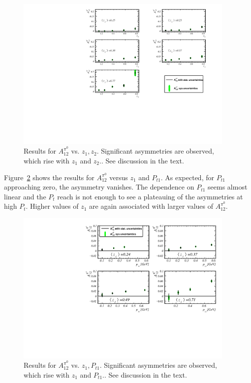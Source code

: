 \documentclass[aps,prX,preprint,groupedaddress,linenumbers]{revtex4-1}
\begin{document}
\begin{figure}
\includegraphics[width=0.95\textwidth]{figs_paper/pi0VsZ1Z2.pdf}
\caption{Results for $A^{\pi^0}_{12}$ vs. $z_1,z_2$. Significant asymmetries are observed, which rise with $z_1$ and $z_2$.\label{fig:resPi0VsZ1Z2}. See discussion in the text.}
\end{figure}

Figure~\ref{fig:resPi0VsZPt} shows the results for $A^{\pi^0}_{12}$ versus $z_1$ and $P_{t1}$. As expected, for $P_{t1}$ approaching zero, the asymmetry vanishes. The dependence on $P_{t1}$ seems almost linear and the $P_t$ reach is not enough to see a plateauing of the asymmetries at high $P_t$. Higher values of $z_1$ are again associated with larger values of $A^{\pi^0}_{12}$.
\begin{figure}
\includegraphics[width=0.95\textwidth]{figs_paper/pi0VsZPt.pdf}
\caption{Results for $A^{\pi^0}_{12}$ vs. $z_1,P_{t1}$. Significant asymmetries are observed, which rise with $z_1$ and $P_{t1}$.\label{fig:resPi0VsZPt}. See discussion in the text.}
\end{figure}
\end{document}
